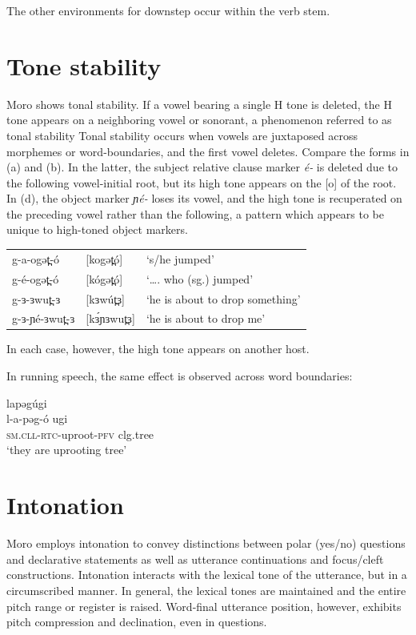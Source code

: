 The other environments for downstep occur within the verb stem. 

\section{Tone stability}
Moro shows tonal stability. If a vowel bearing a single H tone is deleted, the H tone appears on a neighboring vowel or sonorant, a phenomenon referred to as tonal stability Tonal stability occurs when vowels are juxtaposed across morphemes or word-boundaries, and the first vowel deletes. Compare the forms in (a) and (b). In the latter, the subject relative clause marker \textit{é-} is deleted due to the following vowel-initial root, but its high tone appears on the [o] of the root. In (d), the object marker \textit{ɲé-} loses its vowel, and the high tone is recuperated on the preceding vowel rather than the following, a pattern which appears to be unique to high-toned object markers. 

\ea
\begin{tabular}[t]{lll}
g-a-ogət̪-ó	&	[kogət̪ó]	&	‘s/he jumped’\\
g-é-ogət̪-ó	&	[kógət̪ó]	&	‘…. who (sg.) jumped’\\
g-ɜ-ɜwut̪-ɜ	&	[kɜwút̪ɜ]	&	‘he is about to drop something’\\
g-ɜ-ɲé-ɜwut̪-ɜ&	[kɜ́ɲɜwut̪ɜ]	&	‘he is about to drop me’\\
\end{tabular}
\z

In each case, however, the high tone appears on another host.

In running speech, the same effect is observed across word boundaries:

\ea	lapəgúgi\\
	\gll l-a-pəg-ó ugi 	 \\
	\textsc{sm.cll}-\textsc{rtc}-uproot-\textsc{pfv}	 clg.tree	 \\
	\trans ‘they are uprooting tree’
\z

\section{Intonation}
Moro employs intonation to convey distinctions between polar (yes/no) questions and declarative statements as well as utterance continuations and focus/cleft constructions. Intonation interacts with the lexical tone of the utterance, but in a circumscribed manner. In general, the lexical tones are maintained and the entire pitch range or register is raised. Word-final utterance position, however, exhibits pitch compression and declination, even in questions. 

